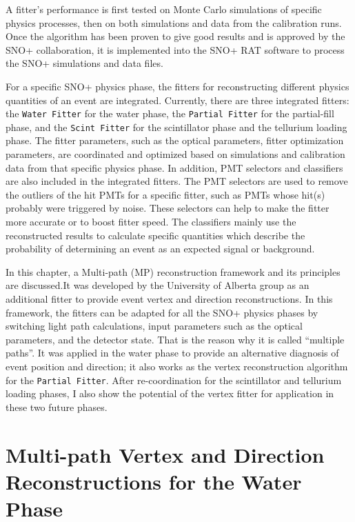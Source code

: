 A fitter's performance is first tested on Monte Carlo simulations of specific physics processes, then on both simulations and data from the calibration runs. Once the algorithm has been proven to give good results and is approved by the SNO+ collaboration, it is implemented into the SNO+ RAT software to process the SNO+ simulations and data files.

For a specific SNO+ physics phase, the fitters for reconstructing different physics quantities of an event are integrated. Currently, there are three integrated fitters: the \texttt{Water Fitter} for the water phase, the \texttt{Partial Fitter} for the partial-fill phase, and the \texttt{Scint Fitter} for the scintillator phase and the tellurium loading phase. The fitter parameters, such as the optical parameters, fitter optimization parameters, are coordinated and optimized based on simulations and calibration data from that specific physics phase. In addition, PMT selectors and classifiers are also included in the integrated fitters. The PMT selectors are used to remove the outliers of the hit PMTs for a specific fitter, such as PMTs whose hit(s) probably were triggered by noise. These selectors can help to make the fitter more accurate or to boost fitter speed. The classifiers mainly use the reconstructed results to calculate specific quantities which describe the probability of determining an event as an expected signal or background.

In this chapter, a Multi-path (MP) reconstruction framework and its principles are discussed.It was developed by the University of Alberta group as an additional fitter to provide event vertex and direction reconstructions. In this framework, the fitters can be adapted for all the SNO+ physics phases by switching light path calculations, input parameters such as the optical parameters, and the detector state. That is the reason why it is called ``multiple paths''.  It was applied in the water phase to provide an alternative diagnosis of event position and direction; it also works as the vertex reconstruction algorithm for the \texttt{Partial Fitter}. After re-coordination for the scintillator and tellurium loading phases, I also show the potential of the vertex fitter for application in these two future phases.
\section{Multi-path Vertex and Direction Reconstructions for the Water Phase}\label{sect:mpw}

